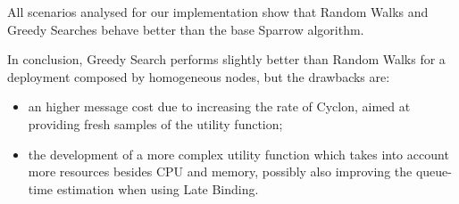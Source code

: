 \documentclass[conference]{IEEEtran}
\begin{document}
  All scenarios analysed for our implementation show that Random Walks and
  Greedy Searches behave better than the base Sparrow algorithm. 
  
  In conclusion, Greedy Search performs slightly better than Random Walks for a deployment composed by homogeneous nodes, but the drawbacks are:
  \begin{itemize}
  
    \item an higher message cost due to increasing the rate of Cyclon, aimed at providing  fresh samples of the utility function;

    \item the development of a more complex utility function which takes
      into account more resources besides CPU and memory, possibly
      also improving the queue-time estimation when using Late Binding.
  \end{itemize}

  
\end{document}
